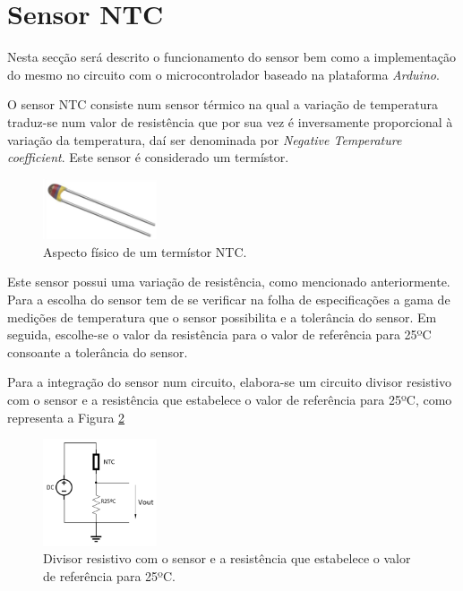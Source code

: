 \section{Sensor NTC}

Nesta secção será descrito o funcionamento do sensor bem como a implementação do mesmo no circuito com o microcontrolador baseado na plataforma \textit{Arduino}.

O sensor NTC consiste num sensor térmico na qual a variação de temperatura traduz-se num valor de resistência que por sua vez é inversamente proporcional à variação da temperatura, daí ser denominada por \textit{Negative Temperature coefficient}. Este sensor é considerado um termístor.
\begin{figure}[!htb]
	\centering
	\includegraphics[width=0.3\textwidth]{img/NTC.PNG}
	\caption{Aspecto físico de um termístor NTC.}
	\label{fig:NTCsensor}
\end{figure}

Este sensor possui uma variação de resistência, como mencionado anteriormente. Para a escolha do sensor tem de se verificar na folha de especificações a gama de medições de temperatura que o sensor possibilita e a tolerância do sensor. Em seguida, escolhe-se o valor da resistência para o valor de referência para 25ºC consoante a tolerância do sensor.

Para a integração do sensor num circuito, elabora-se um circuito divisor resistivo com o sensor e a resistência que estabelece o valor de referência para 25ºC, como representa a Figura \ref{fig:NTCmontagem}
\begin{figure}[!htb]
	\centering
	\includegraphics[width=0.3\textwidth]{img/NTCmontagem.PNG}
	\caption{Divisor resistivo com o sensor e a resistência que estabelece o valor de referência para 25ºC.}
	\label{fig:NTCmontagem}
\end{figure}

